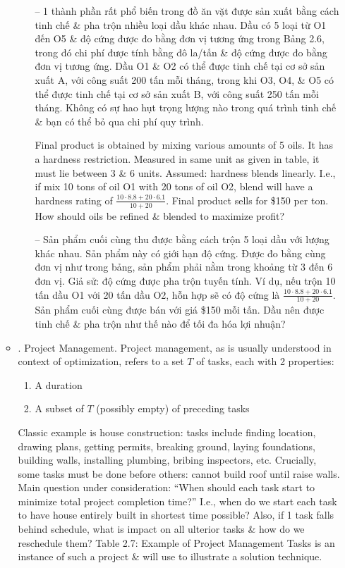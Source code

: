 \documentclass{article}
\begin{document}
\begin{itemize}
\begin{itemize}
\begin{itemize}
            -- 1 thành phần rất phổ biến trong đồ ăn vặt được sản xuất bằng cách tinh chế \& pha trộn nhiều loại dầu khác nhau. Dầu có 5 loại từ O1 đến O5 \& độ cứng được đo bằng đơn vị tương ứng trong {\sf Bảng 2.6}, trong đó chi phí được tính bằng đô la/tấn \& độ cứng được đo bằng đơn vị tương ứng. Dầu O1 \& O2 có thể được tinh chế tại cơ sở sản xuất A, với công suất 200 tấn mỗi tháng, trong khi O3, O4, \& O5 có thể được tinh chế tại cơ sở sản xuất B, với công suất 250 tấn mỗi tháng. Không có sự hao hụt trọng lượng nào trong quá trình tinh chế \& bạn có thể bỏ qua chi phí quy trình.

            Final product is obtained by mixing various amounts of 5 oils. It has a hardness restriction. Measured in same unit as given in table, it must lie between 3 \& 6 units. Assumed: hardness blends linearly. I.e., if mix 10 tons of oil O1 with 20 tons of oil O2, blend will have a hardness rating of $\frac{10\cdot8.8 + 20\cdot6.1}{10 + 20}$. Final product sells for \$150 per ton. How should oils be refined \& blended to maximize profit?

            -- Sản phẩm cuối cùng thu được bằng cách trộn 5 loại dầu với lượng khác nhau. Sản phẩm này có giới hạn độ cứng. Được đo bằng cùng đơn vị như trong bảng, sản phẩm phải nằm trong khoảng từ 3 đến 6 đơn vị. Giả sử: độ cứng được pha trộn tuyến tính. Ví dụ, nếu trộn 10 tấn dầu O1 với 20 tấn dầu O2, hỗn hợp sẽ có độ cứng là $\frac{10\cdot8.8 + 20\cdot6.1}{10 + 20}$. Sản phẩm cuối cùng được bán với giá \$150 mỗi tấn. Dầu nên được tinh chế \& pha trộn như thế nào để tối đa hóa lợi nhuận?
        \end{itemize}
        \item {. Project Management.} Project management, as is usually understood in context of optimization, refers to a set $T$ of tasks, each with 2 properties:
        \begin{enumerate}
            \item A duration
            \item A subset of $T$ (possibly empty) of preceding tasks
        \end{enumerate}
        Classic example is house construction: tasks include finding location, drawing plans, getting permits, breaking ground, laying foundations, building walls, installing plumbing, bribing inspectors, etc. Crucially, some tasks must be done before others: cannot build roof until raise walls. Main question under consideration: ``When should each task start to minimize total project completion time?'' I.e., when do we start each task to have house entirely built in shortest time possible? Also, if 1 task falls behind schedule, what is impact on all ulterior tasks \& how do we reschedule them? {\sf Table 2.7: Example of Project Management Tasks} is an instance of such a project \& will use to illustrate a solution technique.


\end{itemize}
\end{itemize}
\end{document}
